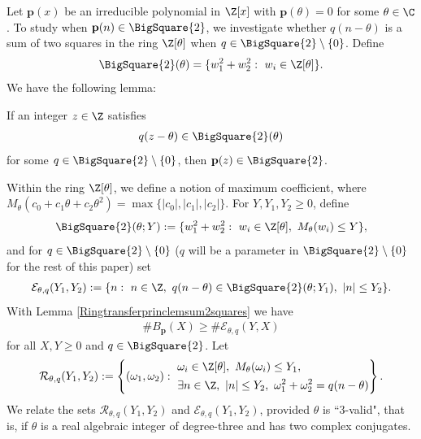 \documentclass[12pt]{amsart}
\newcommand{\1}{\mathmybb{1}}
\begin{document}
Let $\mathbf{p}(x)$ be an irreducible polynomial in $\Z[x]$ with $\mathbf{p}(\theta) = 0$ for some $\theta \in \C$. To study when $\mathbf{p}(n) \in \BigSquare{2}$, we investigate whether $q(n-\theta)$ is a sum of two squares in the ring $\Z[\theta]$ when $q \in \BigSquare{2}\setminus\{0\}$. Define
\begin{align*}
\BigSquare{2}(\theta) = \{w_{1}^2+w_{2}^2: \ w_{i}\in \Z[\theta]\}.
\end{align*}
We have the following lemma:
\begin{lem}
\label{Ringtransferprinclemsum2squares}
If an integer $z \in \Z$ satisfies 
\begin{align*}
q(z-\theta) \in \BigSquare{2}(\theta)
\end{align*}
for some $q \in \BigSquare{2}\setminus\{0\}$, then $\mathbf{p}(z) \in \BigSquare{2}$.
\end{lem}
Within the ring $\Z[\theta]$, we define a notion of maximum coefficient, where $M_{\theta}(c_{0}+c_{1}\theta+c_{2}\theta^2) = \max\{|c_{0}|,|c_{1}|,|c_{2}|\}$. For $Y,Y_{1},Y_{2} \geq 0$, define
\begin{align*}
\BigSquare{2}(\theta;Y) :=\{w_{1}^2+w_{2}^2: \ w_{i}\in \Z[\theta], \ M_{\theta}(w_{i}) \leq Y\},
\end{align*}
and for $q \in \BigSquare{2}\setminus\{0\}$ ($q$ will be a parameter in $\BigSquare{2}\setminus\{0\}$ for the rest of this paper) set
\begin{align*}
\mathcal{E}_{\theta,q}(Y_{1},Y_{2}) := \{n: \ n\in \Z, \ q(n-\theta) \in \BigSquare{2}(\theta;Y_{1}), \ |n| \leq Y_{2}\}.
\end{align*}
With Lemma \ref{Ringtransferprinclemsum2squares} we have
\begin{align}
\label{Tacticalringinequalitysum2squares}
\#B_{\mathbf{p}}(X) \geq \# \mathcal{E}_{\theta,q}(Y,X)
\end{align}
for all $X,Y \geq 0$ and $q \in \BigSquare{2}$. Let
\begin{align*}
\mathcal{R}_{\theta,q}(Y_{1},Y_{2}) := \left\{(\omega_{1},\omega_{2}): \  
\begin{aligned} 
&\omega_{i}\in \Z[\theta], \ M_{\theta}(\omega_{i}) \leq Y_{1}, \\ 
&\exists n \in \Z, \ |n| \leq Y_{2}, \ \omega_{1}^2+\omega_{2}^2 = q(n-\theta)
\end{aligned}\right\}.
\end{align*}
We relate the sets $\mathcal{R}_{\theta,q}(Y_{1},Y_{2})$ and $\mathcal{E}_{\theta,q}(Y_{1},Y_{2})$, provided $\theta$ is ``3-valid", that is, if $\theta$ is a real algebraic integer of degree-three and has two complex conjugates.
\end{document}
